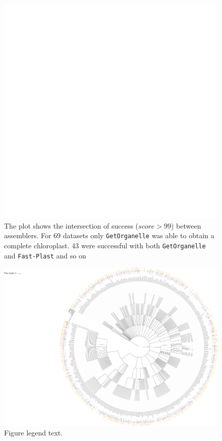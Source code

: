 \documentclass{bmcart}
\newcommand{\formatprogramnames}[1]{\texttt{#1}}
\newcommand{\fp}{\formatprogramnames{Fast-Plast}}
\newcommand{\go}{\formatprogramnames{GetOrganelle}}
\begin{document}
\begin{backmatter}
\begin{figure}[h!]
  \includegraphics[width=\textwidth,page=2]{plots/upset.pdf}
  \caption{
      The plot shows the intersection of success ($score > 99$) between assemblers. For \num{69} datasets only \go{} was able to obtain a complete chloroplast. \num{43} were successful with both \go{} and \fp{} and so on}
            \label{fig:upset}
      \end{figure}

\begin{figure}[h!]
  \includegraphics[width=\textwidth]{plots/real_datasets_tree.pdf}
  \caption{
      Figure legend text. }
      \label{fig:tree}
      \end{figure}


\end{backmatter}
\end{document}
